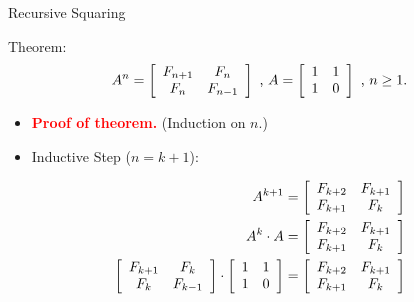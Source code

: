 \documentclass{beamer}
\begin{document}
\begin{frame}{Recursive Squaring}
    \begin{exampleblock}{Theorem:}
        $$
            A^n
            =
            \left[
                \begin{array}{c c}
                    F_{n + 1} & F_n \\
                    F_n       & F_{n - 1}
                \end{array}
            \right] \text{ , }
            A =
            \left[
                \begin{array}{c c}
                    1 & 1 \\
                    1 & 0
                \end{array}
            \right] \text{ , }
            n \geq 1\text{.}
        $$
    \end{exampleblock}
    \begin{itemize}
        \item[] \textbf{\textcolor{red}{Proof of theorem.}} (Induction on $n$.)
        \item[] Inductive Step ($n = k + 1$):
    \end{itemize}
    \pause
    \begin{equation*}
        \begin{split}
        A^{k+1}
        &=
        \left[
            \begin{array}{c c}
                F_{k + 2} & F_{k + 1} \\
                F_{k + 1} & F_{k}
            \end{array}
        \right] \\
        A^{k} \cdot A
        &=
        \left[
            \begin{array}{c c}
                F_{k + 2} & F_{k + 1} \\
                F_{k + 1} & F_{k}
            \end{array}
        \right] \\
        \left[
            \begin{array}{c c}
                F_{k + 1} & F_k \\
                F_k       & F_{k - 1}
            \end{array}
        \right]
        \cdot
        \left[
            \begin{array}{c c}
                1 & 1 \\
                1 & 0
            \end{array}
        \right]
        &=
        \left[
            \begin{array}{c c}
                F_{k + 2} & F_{k + 1} \\
                F_{k + 1} & F_{k}
            \end{array}
        \right] \\
        \end{split}
    \end{equation*}
\end{frame}
\end{document}
